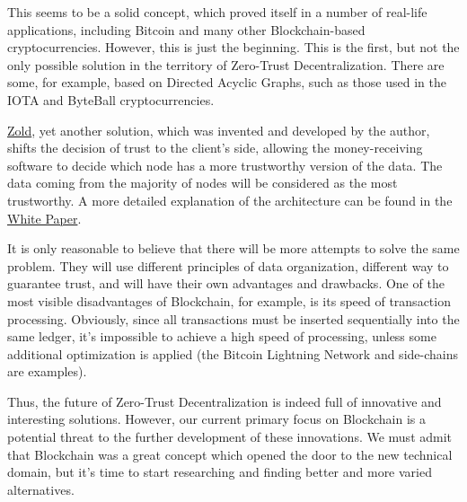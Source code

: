 \documentclass{main}
\begin{document}
This seems to be a solid concept, which proved itself in a number of real-life
applications, including Bitcoin and many other Blockchain-based cryptocurrencies.
However, this is just the beginning. This is the first, but not the only
possible solution in the territory of Zero-Trust Decentralization. There
are some, for example, based on Directed Acyclic Graphs, such as those used in
the IOTA and ByteBall cryptocurrencies.

\href{https://www.zold.io}{Zold}, yet another solution, which was invented and
developed by the author, shifts
the decision of trust to the client's side, allowing the money-receiving
software to decide which node has a more trustworthy version of the data. The data
coming from the majority of nodes will be considered as the most trustworthy.
A more detailed explanation of the architecture can be found in the
\href{https://papers.zold.io/wp.pdf}{White Paper}.

It is only reasonable to believe that there will be more attempts to solve
the same problem. They will use different principles of data organization,
different way to guarantee trust, and will have their own advantages and drawbacks. One of the
most visible disadvantages of Blockchain, for example, is its speed of transaction processing.
Obviously, since all transactions must be inserted
sequentially into the same ledger, it's impossible to achieve a high speed
of processing, unless some additional optimization is applied
(the Bitcoin Lightning Network and side-chains are examples).

Thus, the future of Zero-Trust Decentralization is indeed full of innovative
and interesting solutions. However, our current primary focus on Blockchain is
a potential threat to the further development of these innovations. We must
admit that Blockchain was a great concept which opened the door to the
new technical domain, but it's time to start researching and finding
better and more varied alternatives.
\end{document}
